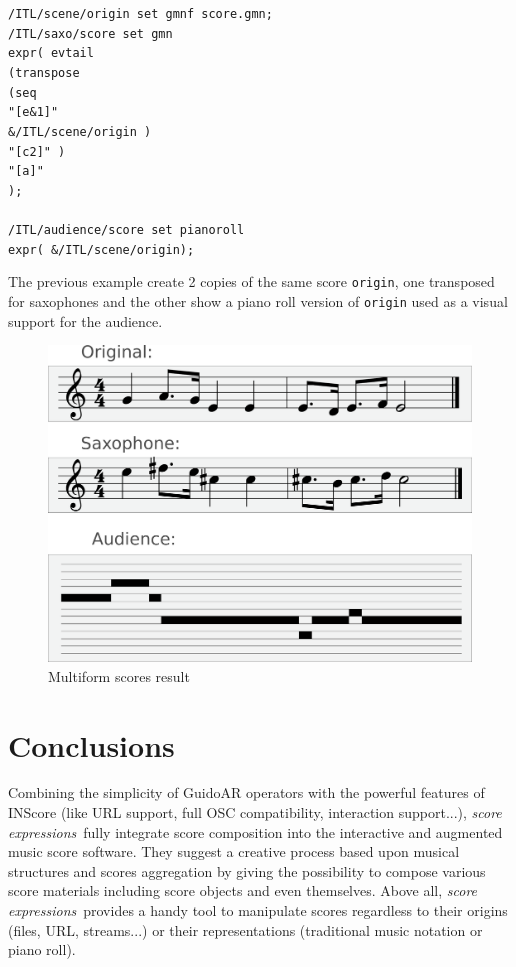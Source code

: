\documentclass{article}
\newcommand{\OSC}[1]{\texttt{#1}}
\newcommand{\sExpr}{\emph{score expressions}}
\newcommand{\tab}{\hspace*{4mm}}
\newcommand{\sample}	[1]			{\vspace{-0.2em}\begin{center}\colorbox{mygrey}{\begin{minipage}[t]{0.95\columnwidth} {\small \texttt{#1}}\end{minipage}}\end{center}}
\begin{document}
\sample{/ITL/scene/origin set gmnf score.gmn;\\
/ITL/saxo/score set gmn \\
\tab expr( evtail\\
\tab \tab (transpose\\
\tab \tab \tab (seq\\
\tab \tab \tab \tab "[e\&1]"\\
\tab \tab \tab \tab \&/ITL/scene/origin )\\
\tab \tab \tab "[c2]" )\\
\tab \tab "[a]"\\
\tab );\\
\\
/ITL/audience/score set pianoroll \\
\tab expr( \&/ITL/scene/origin);
}

The previous example create 2 copies of the same score \OSC{origin}, one transposed for saxophones and the other show a piano roll version of \OSC{origin} used as a visual support for the audience.

\begin{figure}[th]
\centering
\includegraphics[width=0.8\columnwidth]{imgs/example1}
\caption{Multiform scores result
\label{fig:mutliscoreFig}}
\end{figure}

\section{Conclusions}

Combining the simplicity of GuidoAR operators with the powerful features of INScore (like URL support, full OSC compatibility, interaction support...), \sExpr\ fully integrate score composition into the interactive and augmented music score software. They suggest a creative process based upon musical structures and scores aggregation by giving the possibility to compose various score materials including score objects and even themselves. Above all, \sExpr\ provides a handy tool to manipulate scores regardless to their origins (files, URL, streams...) or their representations (traditional music notation or piano roll).
\end{document}
